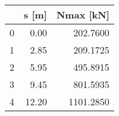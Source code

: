 \begin{tabular}{lrr}
\toprule
{} &  s [m] &  Nmax [kN] \\
\midrule
0 &   0.00 &   202.7600 \\
1 &   2.85 &   209.1725 \\
2 &   5.95 &   495.8915 \\
3 &   9.45 &   801.5935 \\
4 &  12.20 &  1101.2850 \\
\bottomrule
\end{tabular}
